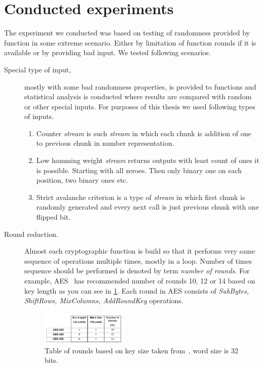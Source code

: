 \documentclass[
    digital,    %
    oneside,    %
    color,
    11pt,
    nocover,
    notable,
    nolof,
    nolot,
    final
]{fithesis3}
\begin{document}
\section{Conducted experiments}

The experiment we conducted was based on testing of randomness provided by function in some extreme scenario. Either by limitation of function rounds if it is available or by providing bad input. We tested following scenarios.

\begin{description}
	\item[Special type of input,] mostly with some bad randomness properties, is provided to functions and statistical analysis is conducted where results are compared with random or other special inputs. For purposes of this thesis we used following types of inputs.
	\begin{enumerate}
		\item Counter \textit{stream} is such \textit{stream} in which each chunk is addition of one to previous chunk in number representation.
		\item Low hamming weight \textit{stream} returns outputs with least count of ones it is possible. Starting with all zeroes. Then only binary one on each position, two binary ones etc.
		\item Strict avalanche criterion is a type of \textit{stream} in which first chunk is randomly generated and every next call is just previous chunk with one flipped bit.
	\end{enumerate}

	\item[Round reduction.] Almost each cryptographic function is build so that it performs very same sequence of operations multiple times, mostly in a loop. Number of times sequence should be performed is denoted by term \textit{number of rounds}. For example, AES~\cite{FIPS-197} has recommended number of rounds 10, 12 or 14 based on key length as you can see in \cref{fig:fips197-rounds}. Each round in AES consists of \textit{SubBytes, ShiftRows, MixColumns, AddRoundKey} operations.
	
	\begin{figure}[h]
		\centering
		\includegraphics[width=0.4\textwidth]{./images/pictures/FIPS197-Nr-table.png}
		\caption{Table of rounds based on key size taken from~\cite{FIPS-197}, word size is 32 bits.}
		\label{fig:fips197-rounds}
	\end{figure}


\end{description}
\end{document}

